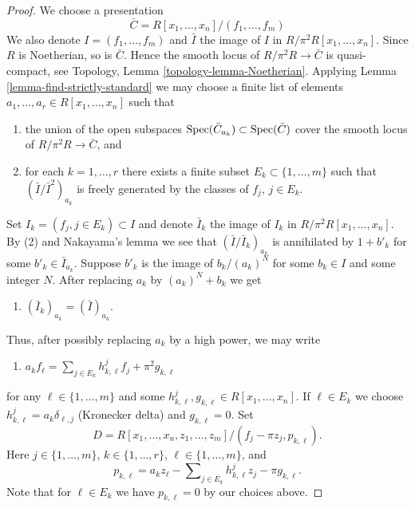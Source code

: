 \begin{proof}
We choose a presentation
$$
\bar C = R[x_1, \ldots, x_n]/(f_1, \ldots, f_m)
$$
We also denote $I = (f_1, \ldots, f_m)$ and $\bar I$ the image of
$I$ in $R/\pi^2R[x_1, \ldots, x_n]$. Since $R$ is Noetherian, so is
$\bar C$. Hence the smooth locus of $R/\pi^2 R \to \bar C$
is quasi-compact, see
Topology, Lemma \ref{topology-lemma-Noetherian}.
Applying
Lemma \ref{lemma-find-strictly-standard}
we may choose a finite list of elements
$a_1, \ldots, a_r \in R[x_1, \ldots, x_n]$ such that
\begin{enumerate}
\item the union of the open subspaces
$\mathop{\mathrm{Spec}}(\bar C_{a_k}) \subset \mathop{\mathrm{Spec}}(\bar C)$
cover the smooth locus of $R/\pi^2 R \to \bar C$, and
\item for each $k = 1, \ldots, r$ there exists a finite subset
$E_k \subset \{1, \ldots, m\}$ such that
$(\bar I/\bar I^2)_{a_k}$ is freely generated by the classes of
$f_j$, $j \in E_k$.
\end{enumerate}
Set $I_k = (f_j, j \in E_k) \subset I$ and denote $\bar I_k$ the
image of $I_k$ in $R/\pi^2R[x_1, \ldots, x_n]$.
By (2) and Nakayama's lemma we see that $(\bar I/\bar I_k)_{a_k}$
is annihilated by $1 + b'_k$ for some $b'_k \in \bar I_{a_k}$.
Suppose $b'_k$ is the image of $b_k/(a_k)^N$ for some $b_k \in I$
and some integer $N$. After replacing $a_k$ by $(a_k)^N + b_k$ we get
\begin{enumerate}
\item[(3)] $(\bar I_k)_{a_k} = (\bar I)_{a_k}$.
\end{enumerate}
Thus, after possibly replacing $a_k$ by a high power, we may write
\begin{enumerate}
\item[(4)]
$a_k f_\ell = \sum\nolimits_{j \in E_k} h_{k, \ell}^jf_j + \pi^2 g_{k, \ell}$
\end{enumerate}
for any $\ell \in \{1, \ldots, m\}$ and some
$h_{k, \ell}^j, g_{k, \ell} \in R[x_1, \ldots, x_n]$.
If $\ell \in E_k$ we choose $h_{k, \ell}^j = a_k\delta_{\ell, j}$
(Kronecker delta) and $g_{k, \ell} = 0$. Set
$$
D = R[x_1, \ldots, x_n, z_1, \ldots, z_m]/
(f_j - \pi z_j, p_{k, \ell}).
$$
Here $j \in \{1, \ldots, m\}$, $k \in \{1, \ldots, r\}$,
$\ell \in \{1, \ldots, m\}$, and
$$
p_{k, \ell} = a_k z_\ell - \sum\nolimits_{j \in E_k} h_{k, \ell}^j z_j
- \pi g_{k, \ell}.
$$
Note that for $\ell \in E_k$ we have $p_{k, \ell} = 0$ by our choices above.


\end{proof}
